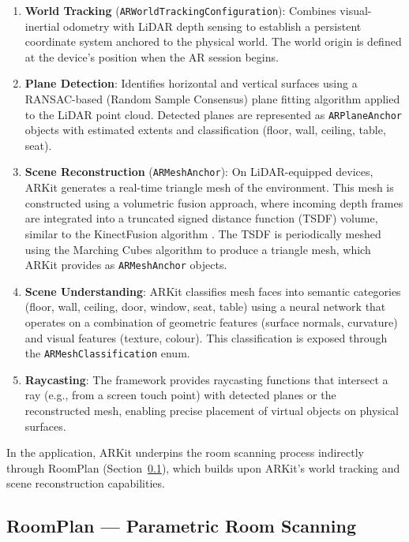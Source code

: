 \begin{enumerate}
    \item \textbf{World Tracking} (\texttt{ARWorldTrackingConfiguration}): Combines visual-inertial odometry with LiDAR depth sensing to establish a persistent coordinate system anchored to the physical world. The world origin is defined at the device's position when the AR session begins.

    \item \textbf{Plane Detection}: Identifies horizontal and vertical surfaces using a RANSAC-based (Random Sample Consensus) plane fitting algorithm applied to the LiDAR point cloud. Detected planes are represented as \texttt{ARPlaneAnchor} objects with estimated extents and classification (floor, wall, ceiling, table, seat).

    \item \textbf{Scene Reconstruction} (\texttt{ARMeshAnchor}): On LiDAR-equipped devices, ARKit generates a real-time triangle mesh of the environment. This mesh is constructed using a volumetric fusion approach, where incoming depth frames are integrated into a truncated signed distance function (TSDF) volume, similar to the KinectFusion algorithm \cite{newcombe2011kinectfusion}. The TSDF is periodically meshed using the Marching Cubes algorithm to produce a triangle mesh, which ARKit provides as \texttt{ARMeshAnchor} objects.

    \item \textbf{Scene Understanding}: ARKit classifies mesh faces into semantic categories (floor, wall, ceiling, door, window, seat, table) using a neural network that operates on a combination of geometric features (surface normals, curvature) and visual features (texture, colour). This classification is exposed through the \texttt{ARMeshClassification} enum.

    \item \textbf{Raycasting}: The framework provides raycasting functions that intersect a ray (e.g., from a screen touch point) with detected planes or the reconstructed mesh, enabling precise placement of virtual objects on physical surfaces.
\end{enumerate}

In the application, ARKit underpins the room scanning process indirectly through RoomPlan (Section~\ref{subsec:roomplan}), which builds upon ARKit's world tracking and scene reconstruction capabilities.


\subsection{RoomPlan — Parametric Room Scanning}
\label{subsec:roomplan}

